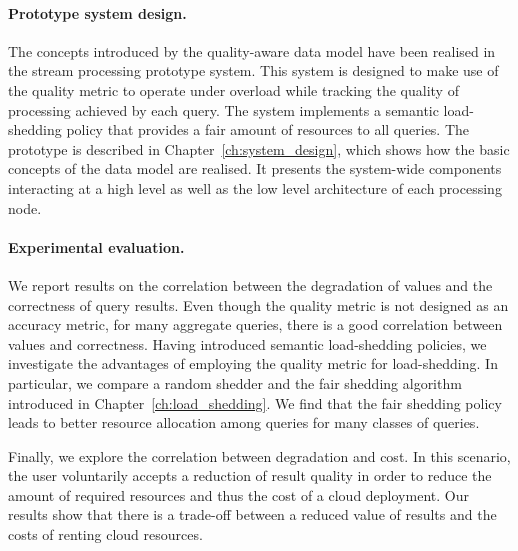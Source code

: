 \paragraph{Prototype system design.} 
The concepts introduced by the quality-aware data model have been realised in the \sys stream processing
prototype system. 
This system is designed to make use of the \sic quality metric to
operate under overload while tracking the quality of processing achieved by each query. 
The system implements a semantic load-shedding policy that provides a fair amount of resources to all
queries.
The prototype is described in Chapter~\ref{ch:system_design}, which shows how the basic concepts of the
data model are realised. It presents the system-wide components interacting at a high level as well as
the low level architecture of each processing node.
\vspace{-3pt}
\paragraph{Experimental evaluation.}
We report results on the correlation between the degradation of \sic values and the
correctness of query results. Even though the \sic quality metric is not designed as an accuracy metric,
for many aggregate queries, there is a good correlation between \sic values and correctness.
Having introduced semantic load-shedding policies, we investigate the advantages of employing the \sic
quality metric for \mbox{load-shedding}. In particular, we compare a random shedder and the fair shedding
algorithm introduced in Chapter~\ref{ch:load_shedding}. We find that the fair shedding policy
leads to better resource allocation among queries for many classes of queries.

Finally, we explore the correlation between \sic degradation and cost. In
this scenario, the user voluntarily accepts a reduction of result quality in order to reduce the amount
of required resources and thus the cost of a cloud deployment. Our results show that there is a trade-off between a reduced \sic value of results and the costs
of renting cloud resources.

